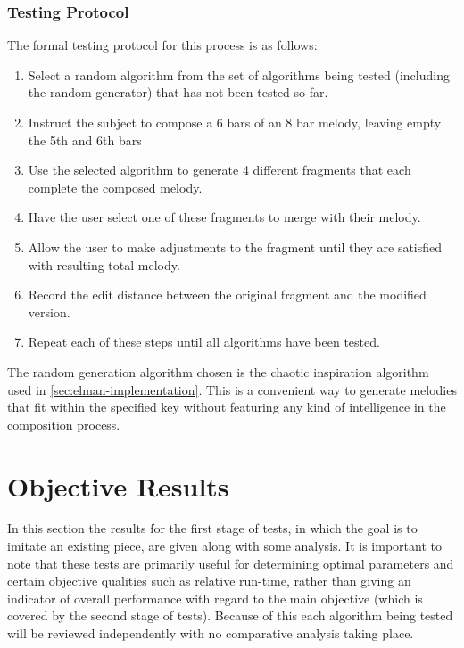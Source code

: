 \documentclass[ author={Stephen Livermore-Tozer},
				supervisor={Dr. Peter Flach},
				degree={MEng},
				title={Algorithmic Co-composition Using Machine Learning},
				subtitle={},
				type={research},
				year={2016} ]{dissertation}
\begin{document}
	
	\subsubsection{Testing Protocol}
	
	The formal testing protocol for this process is as follows:
	\begin{enumerate}
		\item Select a random algorithm from the set of algorithms being tested (including the random generator) that has not been tested so far.
		\item Instruct the subject to compose a 6 bars of an 8 bar melody, leaving empty the 5th and 6th bars
		\item Use the selected algorithm to generate 4 different fragments that each complete the composed melody.
		\item Have the user select one of these fragments to merge with their melody.
		\item Allow the user to make adjustments to the fragment until they are satisfied with resulting total melody.
		\item Record the edit distance between the original fragment and the modified version.
		\item Repeat each of these steps until all algorithms have been tested.
	\end{enumerate}
	
	The random generation algorithm chosen is the chaotic inspiration algorithm used in \ref{sec:elman-implementation}. This is a convenient way to generate melodies that fit within the specified key without featuring any kind of intelligence in the composition process.
	
	\section{Objective Results}

	In this section the results for the first stage of tests, in which the goal is to imitate an existing piece, are given along with some analysis. It is important to note that these tests are primarily useful for determining optimal parameters and certain objective qualities such as relative run-time, rather than giving an indicator of overall performance with regard to the main objective (which is covered by the second stage of tests). Because of this each algorithm being tested will be reviewed independently with no comparative analysis taking place.
	
\end{document}
